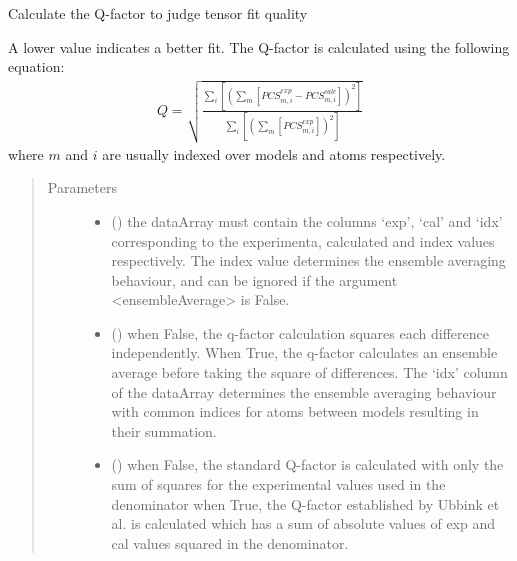 \documentclass[a4paper,10pt,english,openany,oneside]{sphinxmanual}
\begin{document}
\begin{fulllineitems}
\label{\detokenize{reference/generated/paramagpy.fit.qfactor:paramagpy.fit.qfactor}}
Calculate the Q-factor to judge tensor fit quality

A lower value indicates a better fit. The Q-factor is calculated using
the following equation:
\begin{equation*}
\begin{split}Q = \sqrt{
        \frac{\sum_i\left[\left(\sum_m\left[
        PCS^{exp}_{m,i}-PCS^{calc}_{m,i}\right]\right)^2\right]}
        {\sum_i\left[
        \left(\sum_m\left[PCS^{exp}_{m,i}\right]\right)^2\right]}
}\end{split}
\end{equation*}
where \(m\) and \(i\) are usually indexed over models and atoms
respectively.
\begin{quote}\begin{description}
\item[{Parameters}] \leavevmode\begin{itemize}
\item {} 
 () \textendash{} the dataArray must contain the columns ‘exp’, ‘cal’ and ‘idx’
corresponding to the experimenta, calculated and index values
respectively. The index value determines the ensemble averaging
behaviour, and can be ignored if the argument \textless{}ensembleAverage\textgreater{}
is False.

\item {} 
 (\sphinxstyleliteralemphasis{\sphinxupquote{, }}) \textendash{} when False, the q-factor calculation squares each difference
independently.
When True, the q-factor calculates an ensemble average before
taking the square of differences. The ‘idx’ column of the dataArray
determines the ensemble averaging behaviour with common indices
for atoms between models resulting in their summation.

\item {} 
 (\sphinxstyleliteralemphasis{\sphinxupquote{, }}) \textendash{} when False, the standard Q-factor is calculated with only the sum
of squares for the experimental values used in the denominator
when True, the Q-factor established by Ubbink et al. is
calculated which has a sum of absolute values of exp and cal
values squared in the denominator.


\end{itemize}
\end{description}
\end{quote}
\end{fulllineitems}
\end{document}
